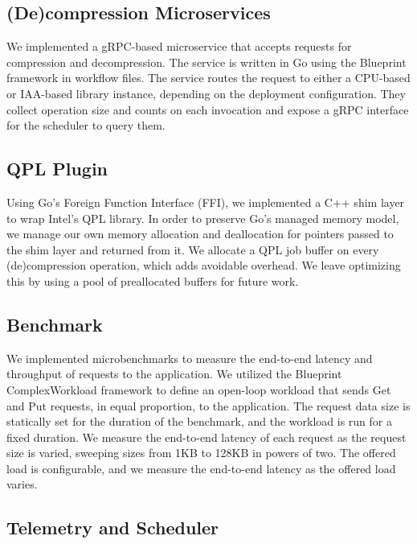 \subsection{(De)compression Microservices}

We implemented a gRPC-based microservice that accepts requests for compression and decompression.
The service is written in Go using the Blueprint framework in workflow files.
The service routes the request to either a CPU-based or IAA-based library instance, depending on the deployment configuration.
They collect operation size and counts on each invocation and expose a gRPC interface for the scheduler to query them.

\subsection{QPL Plugin}

Using Go's Foreign Function Interface (FFI), we implemented a C++ shim layer to wrap Intel's QPL library.
In order to preserve Go's managed memory model, we manage our own memory allocation and deallocation for pointers passed to the shim layer and returned from it.
We allocate a QPL job buffer on every (de)compression operation, which adds avoidable overhead.
We leave optimizing this by using a pool of preallocated buffers for future work.

\subsection{Benchmark}

We implemented microbenchmarks to measure the end-to-end latency and throughput of requests to the application.
We utilized the Blueprint ComplexWorkload framework to define an open-loop workload that sends Get and Put requests, in equal proportion, to the application.
The request data size is statically set for the duration of the benchmark, and the workload is run for a fixed duration.
We measure the end-to-end latency of each request as the request size is varied, sweeping sizes from 1KB to 128KB in powers of two.
The offered load is configurable, and we measure the end-to-end latency as the offered load varies.

\subsection{Telemetry and Scheduler}

